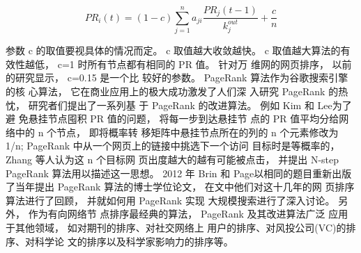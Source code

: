 \[P{R_i}(t) = (1 - c)\sum\limits_{j = 1}^n {{a_{ji}}\frac{{P{R_j}(t - 1)}}{{k_j^{out}}}}  + \frac{c}{n}\]

				参数 c 的取值要视具体的情况而定。 c 取值越大收敛越快。 c 取值越大算法的有 效性越低， c=1 时所有节点都有相同的 PR 值。 针对万 维网的网页排序， 以前的研究显示， c=0.15 是一个比 较好的参数。 PageRank 算法作为谷歌搜索引擎的核 心算法， 它在商业应用上的极大成功激发了人们深 入研究 PageRank 的热忱， 研究者们提出了一系列基 于 PageRank 的改进算法。 例如 Kim 和 Lee\parencite{Kim2002An}为了避 免悬挂节点囤积 PR 值的问题， 将每一步到达悬挂节 点的 PR 值平均分给网络中的 n 个节点， 即将概率转 移矩阵中悬挂节点所在的列的 n 个元素修改为 1/n; PageRank 中从一个网页上的链接中挑选下一个访问 目标时是等概率的， Zhang 等人\parencite{Zhang2007N}认为这 n 个目标网 页出度越大的越有可能被点击， 并提出 N-step PageRank 算法用以描述这一思想。 2012 年 Brin 和 Page\parencite{Sergey1998The}以相同的题目重新出版了当年提出 PageRank 算法的博士学位论文， 在文中他们对这十几年的网 页排序算法进行了回顾， 并就如何用 PageRank 实现 大规模搜索进行了深入讨论。 另外， 作为有向网络节 点排序最经典的算法， PageRank 及其改进算法广泛 应用于其他领域， 如对期刊的排序\parencite{Jacso2012Grim}、对社交网络上 用户的排序\parencite{Weng2010TwitterRank}、对风投公司(VC)的排序\parencite{Bhat2012InvestorRank}、对科学论 文的排序\parencite{Petersen2010Methods}以及科学家影响力的排序\parencite{Ding2009PageRank}等。


